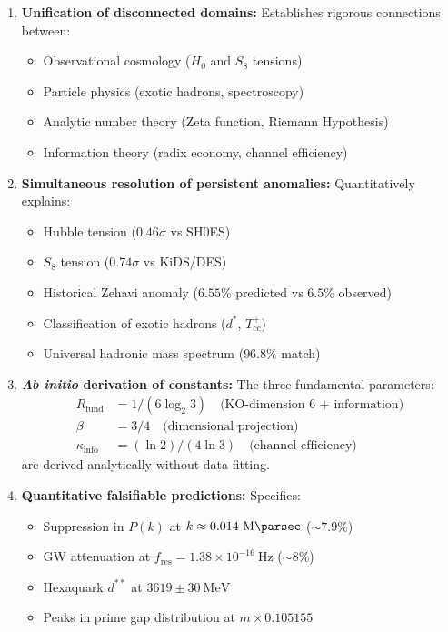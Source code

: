 \documentclass[11pt, a4paper]{article}
\theoremstyle{plain}
\theoremstyle{definition}
\newcommand{\Rfactor}{R_{\text{fund}}}
\newcommand{\Kinfo}{\kappa_{\text{info}}}
\begin{document}
\begin{enumerate}
    \item \textbf{Unification of disconnected domains:} Establishes rigorous connections between:
    \begin{itemize}
        \item Observational cosmology ($H_0$ and $S_8$ tensions)
        \item Particle physics (exotic hadrons, spectroscopy)
        \item Analytic number theory (Zeta function, Riemann Hypothesis)
        \item Information theory (radix economy, channel efficiency)
    \end{itemize}
    
    \item \textbf{Simultaneous resolution of persistent anomalies:} Quantitatively explains:
    \begin{itemize}
        \item Hubble tension ($0.46\sigma$ vs SH0ES)
        \item $S_8$ tension ($0.74\sigma$ vs KiDS/DES)
        \item Historical Zehavi anomaly ($6.55\%$ predicted vs $6.5\%$ observed)
        \item Classification of exotic hadrons ($d^*$, $T_{cc}^+$)
        \item Universal hadronic mass spectrum ($96.8\%$ match)
    \end{itemize}
    
    \item \textbf{\textit{Ab initio} derivation of constants:} The three fundamental parameters:
    \begin{align*}
        \Rfactor &= 1/(6\log_2 3) \quad \text{(KO-dimension 6 + information)} \\
        \beta &= 3/4 \quad \text{(dimensional projection)} \\
        \Kinfo &= (\ln 2)/(4\ln 3) \quad \text{(channel efficiency)}
    \end{align*}
    are derived analytically without data fitting.
    
    \item \textbf{Quantitative falsifiable predictions:} Specifies:
    \begin{itemize}
        \item Suppression in $P(k)$ at $k \approx 0.014\ \si{\per\mega\parsec}$ ($\sim 7.9\%$)
        \item GW attenuation at $f_{\text{res}} = 1.38 \times 10^{-16}\ \si{\hertz}$ ($\sim 8\%$)
        \item Hexaquark $d^{**}$ at $3619 \pm 30\ \si{\mega\electronvolt}$
        \item Peaks in prime gap distribution at $m \times 0.105155$        
    \end{itemize}


\end{enumerate}
\end{document}
